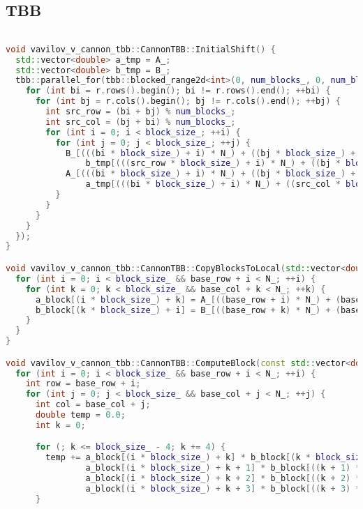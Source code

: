 \documentclass[a4paper,12pt]{article}
\begin{document}
\subsection{TBB}
\begin{lstlisting}[language=C++]

void vavilov_v_cannon_tbb::CannonTBB::InitialShift() {
  std::vector<double> a_tmp = A_;
  std::vector<double> b_tmp = B_;
  tbb::parallel_for(tbb::blocked_range2d<int>(0, num_blocks_, 0, num_blocks_), [&](const tbb::blocked_range2d<int>& r) {
    for (int bi = r.rows().begin(); bi != r.rows().end(); ++bi) {
      for (int bj = r.cols().begin(); bj != r.cols().end(); ++bj) {
        int src_row = (bi + bj) % num_blocks_;
        int src_col = (bj + bi) % num_blocks_;
        for (int i = 0; i < block_size_; ++i) {
          for (int j = 0; j < block_size_; ++j) {
            B_[(((bi * block_size_) + i) * N_) + ((bj * block_size_) + j)] =
                b_tmp[(((src_row * block_size_) + i) * N_) + ((bj * block_size_) + j)];
            A_[(((bi * block_size_) + i) * N_) + ((bj * block_size_) + j)] =
                a_tmp[(((bi * block_size_) + i) * N_) + ((src_col * block_size_) + j)];
          }
        }
      }
    }
  });
}

void vavilov_v_cannon_tbb::CannonTBB::CopyBlocksToLocal(std::vector<double>& a_block, std::vector<double>& b_block, int base_row, int base_col) {
  for (int i = 0; i < block_size_ && base_row + i < N_; ++i) {
    for (int k = 0; k < block_size_ && base_col + k < N_; ++k) {
      a_block[(i * block_size_) + k] = A_[((base_row + i) * N_) + (base_col + k)];
      b_block[(k * block_size_) + i] = B_[((base_row + k) * N_) + (base_col + i)];
    }
  }
}

void vavilov_v_cannon_tbb::CannonTBB::ComputeBlock(const std::vector<double>& a_block, const std::vector<double>& b_block, int base_row, int base_col) {
  for (int i = 0; i < block_size_ && base_row + i < N_; ++i) {
    int row = base_row + i;
    for (int j = 0; j < block_size_ && base_col + j < N_; ++j) {
      int col = base_col + j;
      double temp = 0.0;
      int k = 0;

      for (; k <= block_size_ - 4; k += 4) {
        temp += a_block[(i * block_size_) + k] * b_block[(k * block_size_) + j] +
                a_block[(i * block_size_) + k + 1] * b_block[((k + 1) * block_size_) + j] +
                a_block[(i * block_size_) + k + 2] * b_block[((k + 2) * block_size_) + j] +
                a_block[(i * block_size_) + k + 3] * b_block[((k + 3) * block_size_) + j];
      }


\end{lstlisting}
\end{document}
